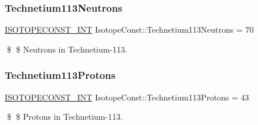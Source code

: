 \subsubsection{\texorpdfstring{Technetium113\+Neutrons}{Technetium113Neutrons}}
{\footnotesize\ttfamily \mbox{\hyperlink{group___isotope_const-_macros_ga5f18360b3e99483a35c32d789e62621c}{I\+S\+O\+T\+O\+P\+E\+C\+O\+N\+S\+T\+\_\+\+I\+NT}} Isotope\+Const\+::\+Technetium113\+Neutrons = 70}

\$ \$ Neutrons in Technetium-\/113. \mbox{\label{group___isotope_const-_technetium-_tc113_gaedbff31519fd2421a9eab06b942ffd2f}} 
\subsubsection{\texorpdfstring{Technetium113\+Protons}{Technetium113Protons}}
{\footnotesize\ttfamily \mbox{\hyperlink{group___isotope_const-_macros_ga5f18360b3e99483a35c32d789e62621c}{I\+S\+O\+T\+O\+P\+E\+C\+O\+N\+S\+T\+\_\+\+I\+NT}} Isotope\+Const\+::\+Technetium113\+Protons = 43}

\$ \$ Protons in Technetium-\/113. 